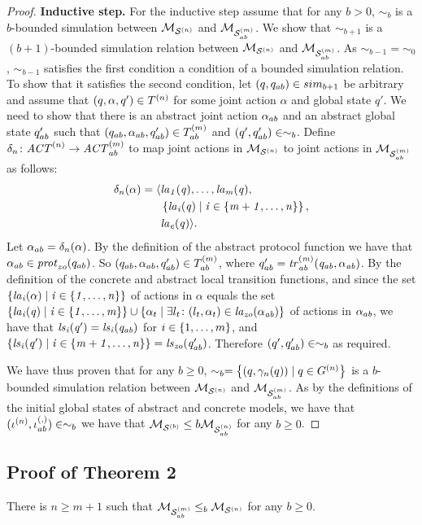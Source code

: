\begin{proof}
{\bf Inductive step.} For the inductive step assume that for any $b >0$,
$\sim_b$ is a $b$-bounded simulation between $\mathcal{M}_{\mathcal{S}^{(n)}}$ and $\mathcal{M}_{\mathcal{S}_{ab}^{(m)}}$. We show
that $\sim_{b+1}$ is a $(b+1)$-bounded simulation relation  between $\mathcal{M}_{\mathcal{S}^{(n)}}$
and $\mathcal{M}_{\mathcal{S}_{ab}^{(m)}}$.  As $\sim_{b-1} = \sim_0$, $\sim_{b-1}$ satisfies the first
condition a condition of a bounded simulation relation. To show that it
satisfies the second condition, let $(q, q_{ab}) \in sim_{b+1}$ be arbitrary
and assume that $(q, \alpha, q') \in T^{(n)}$ for some joint action
$\alpha$ and global state $q'$. We need to show that there is an abstract joint
action $\alpha_{ab}$ and an abstract global state $q_{ab}'$ such that
$(q_{ab}, \alpha_{ab}, q_{ab}') \in T^{(m)}_{ab}$ and $(q', q_{ab}') \in
\sim_b$.  Define $\delta_n \colon \mathit{ACT}^{(n)} \rightarrow \mathit{ACT}^{(m)}_{ab}$ to
map joint actions in $\mathcal{M}_{\mathcal{S}^{(n)}}$ to joint actions in $\mathcal{M}_{\mathcal{S}_{ab}^{(m)}}$ as follows:
\begin{align*}
  \delta_n(\alpha) =  \langle &\it{la}_{1}({q}), \ldots, \it{la}_{m}({q}), \\
  &\left \{ \it{la}_{i}({q}) \mid i \in \left \{ m + 1, \ldots, n \right \} \right \}, \\
  &\it{la}_{e}({q})  \rangle.
\end{align*}
Let $\alpha_{ab} = \delta_n(\alpha)$. By the definition of the abstract protocol
function we have that $\alpha_{ab} \in \mathit{prot}_{zo}(q_{ab})$. So $(q_{ab},
\alpha_{ab}, q_{ab}') \in T^{(m)}_{ab}$, where $q_{ab}' = \it{tr}^{(m)}_{ab}
(q_{ab}, \alpha_{ab})$. By the definition of the concrete and abstract local
transition functions, and since the set $\left \{ \it{la}_{i}({\alpha}) \mid i \in
\left \{ 1,\ldots,n \right \} \right \}$ of actions in $\alpha$ equals the set $\left \{ \it{la}_{i}({q}) \mid i
\in \left \{ 1,\ldots,m \right \} \right \} \cup \left \{ \alpha_t \mid \exists l_t \colon (l_t, \alpha_t)
\in \it{la}_{zo}({\alpha_{ab}}) \right \}$ of actions in $\alpha_{ab}$, we have that $\it{ls}_{i}(q') =
\it{ls}_{i}(q_{ab})$ for $i \in \left \{ 1,\ldots,m \right \}$, and $\left \{ \it{ls}_{i}(q') \mid i \in
\left \{ m+1,\ldots,n \right \} \right \} = \it{ls}_{zo}(q_{ab}')$.  Therefore $(q', q_{ab}') \in
\sim_b$ as required.

We have thus proven that for any $b \geq 0$, $\sim_b = \left \{ (q, \gamma_n(q))
\mid q \in G^{(n)}  \right \}$ is a $b$-bounded simulation relation between
$\mathcal{M}_{\mathcal{S}^{(n)}}$ and $\mathcal{M}_{\mathcal{S}_{ab}^{(m)}}$.  As by the definitions of the initial global states of
abstract and concrete models, we have that $(\iota^{({n})}, \iota^{({,})}_{ab})
\in \sim_b$ we have that $\mathcal{M}_{\mathcal{S}^{(b)}} \leq b \mathcal{M}_{\mathcal{S}_{ab}^{(n)}}$ for any $b \geq 0$.

\end{proof}


\subsection*{Proof of Theorem 2}
\begin{customthm}{2}
There is $n \geq m+1$ such that $\mathcal{M}_{\mathcal{S}_{ab}^{(m)}} \leq_b \mathcal{M}_{\mathcal{S}^{(n)}}$ for any $b \geq 0$.
\end{customthm}

